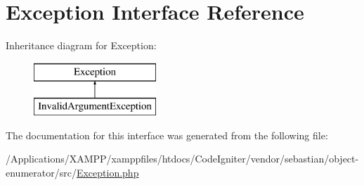 \hypertarget{interface_sebastian_bergmann_1_1_object_enumerator_1_1_exception}{}\section{Exception Interface Reference}
\label{interface_sebastian_bergmann_1_1_object_enumerator_1_1_exception}
Inheritance diagram for Exception\+:\begin{figure}[H]
\begin{center}
\leavevmode
\includegraphics[height=2.000000cm]{interface_sebastian_bergmann_1_1_object_enumerator_1_1_exception}
\end{center}
\end{figure}


The documentation for this interface was generated from the following file\+:\begin{DoxyCompactItemize}
\item 
/\+Applications/\+X\+A\+M\+P\+P/xamppfiles/htdocs/\+Code\+Igniter/vendor/sebastian/object-\/enumerator/src/\mbox{\hyperlink{sebastian_2object-enumerator_2src_2_exception_8php}{Exception.\+php}}\end{DoxyCompactItemize}
